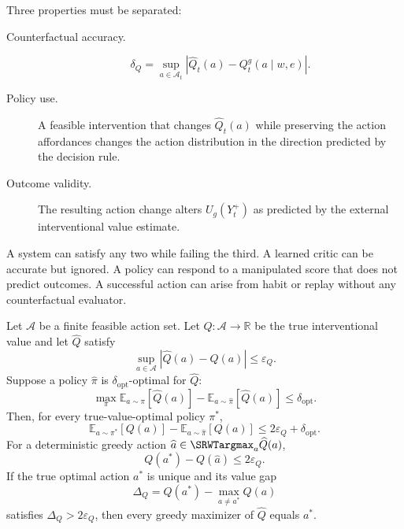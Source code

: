 
Three properties must be separated:
\begin{description}
\item[Counterfactual accuracy.]
\[
\delta_Q
=
\sup_{a\in\mathcal A_t}
|\widehat Q_t(a)-Q_t^g(a\mid w,e)|.
\]

\item[Policy use.]
A feasible intervention that changes \(\widehat Q_t(a)\) while preserving the
action affordances changes the action distribution in the direction predicted
by the decision rule.

\item[Outcome validity.]
The resulting action change alters \(U_g(Y_t^+)\) as predicted by the external
interventional value estimate.
\end{description}

A system can satisfy any two while failing the third. A learned critic can be
accurate but ignored. A policy can respond to a manipulated score that does
not predict outcomes. A successful action can arise from habit or replay
without any counterfactual evaluator.


\begin{SRWTtheorem}
\label{SRWT:thm:counterfactual-policy}
Let \(\mathcal A\) be a finite feasible action set. Let \(Q:\mathcal A\to
\mathbb R\) be the true interventional value and let \(\widehat Q\) satisfy
\[
\sup_{a\in\mathcal A}|\widehat Q(a)-Q(a)|\leq\varepsilon_Q.
\]
Suppose a policy \(\widehat\pi\) is \(\delta_{\mathrm{opt}}\)-optimal for
\(\widehat Q\):
\[
\max_{\pi}
\mathbb E_{a\sim\pi}[\widehat Q(a)]
-
\mathbb E_{a\sim\widehat\pi}[\widehat Q(a)]
\leq
\delta_{\mathrm{opt}}.
\]
Then, for every true-value-optimal policy \(\pi^*\),
\[
\boxed{
\mathbb E_{a\sim\pi^*}[Q(a)]
-
\mathbb E_{a\sim\widehat\pi}[Q(a)]
\leq
2\varepsilon_Q+\delta_{\mathrm{opt}}.
}
\]
For a deterministic greedy action \(\widehat a\in\SRWTargmax_a\widehat Q(a)\),
\[
Q(a^*)-Q(\widehat a)
\leq2\varepsilon_Q.
\]
If the true optimal action \(a^*\) is unique and its value gap
\[
\Delta_Q
=
Q(a^*)-
\max_{a\neq a^*}Q(a)
\]
satisfies \(\Delta_Q>2\varepsilon_Q\), then every greedy maximizer of
\(\widehat Q\) equals \(a^*\).
\end{SRWTtheorem}

